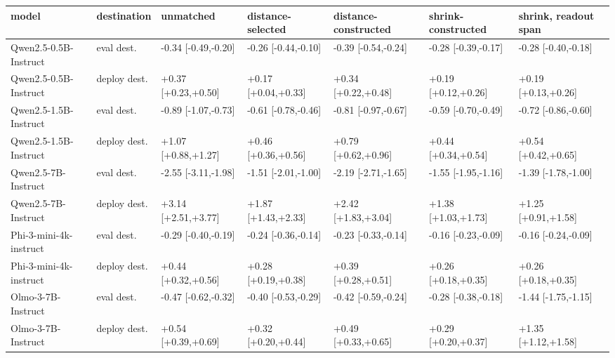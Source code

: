 \begin{tabular}{lllllll}
\toprule
model & destination & unmatched & distance-selected & distance-constructed & shrink-constructed & shrink, readout span \\
\midrule
Qwen2.5-0.5B-Instruct & eval dest. & -0.34 [-0.49,-0.20] & -0.26 [-0.44,-0.10] & -0.39 [-0.54,-0.24] & -0.28 [-0.39,-0.17] & -0.28 [-0.40,-0.18] \\
Qwen2.5-0.5B-Instruct & deploy dest. & +0.37 [+0.23,+0.50] & +0.17 [+0.04,+0.33] & +0.34 [+0.22,+0.48] & +0.19 [+0.12,+0.26] & +0.19 [+0.13,+0.26] \\
Qwen2.5-1.5B-Instruct & eval dest. & -0.89 [-1.07,-0.73] & -0.61 [-0.78,-0.46] & -0.81 [-0.97,-0.67] & -0.59 [-0.70,-0.49] & -0.72 [-0.86,-0.60] \\
Qwen2.5-1.5B-Instruct & deploy dest. & +1.07 [+0.88,+1.27] & +0.46 [+0.36,+0.56] & +0.79 [+0.62,+0.96] & +0.44 [+0.34,+0.54] & +0.54 [+0.42,+0.65] \\
Qwen2.5-7B-Instruct & eval dest. & -2.55 [-3.11,-1.98] & -1.51 [-2.01,-1.00] & -2.19 [-2.71,-1.65] & -1.55 [-1.95,-1.16] & -1.39 [-1.78,-1.00] \\
Qwen2.5-7B-Instruct & deploy dest. & +3.14 [+2.51,+3.77] & +1.87 [+1.43,+2.33] & +2.42 [+1.83,+3.04] & +1.38 [+1.03,+1.73] & +1.25 [+0.91,+1.58] \\
Phi-3-mini-4k-instruct & eval dest. & -0.29 [-0.40,-0.19] & -0.24 [-0.36,-0.14] & -0.23 [-0.33,-0.14] & -0.16 [-0.23,-0.09] & -0.16 [-0.24,-0.09] \\
Phi-3-mini-4k-instruct & deploy dest. & +0.44 [+0.32,+0.56] & +0.28 [+0.19,+0.38] & +0.39 [+0.28,+0.51] & +0.26 [+0.18,+0.35] & +0.26 [+0.18,+0.35] \\
Olmo-3-7B-Instruct & eval dest. & -0.47 [-0.62,-0.32] & -0.40 [-0.53,-0.29] & -0.42 [-0.59,-0.24] & -0.28 [-0.38,-0.18] & -1.44 [-1.75,-1.15] \\
Olmo-3-7B-Instruct & deploy dest. & +0.54 [+0.39,+0.69] & +0.32 [+0.20,+0.44] & +0.49 [+0.33,+0.65] & +0.29 [+0.20,+0.37] & +1.35 [+1.12,+1.58] \\
\bottomrule
\end{tabular}
